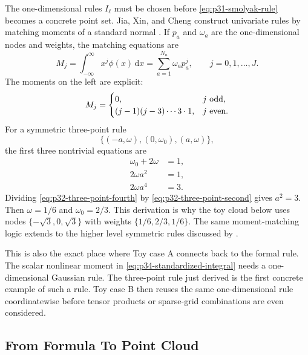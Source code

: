 \documentclass[11pt]{article}
\numberwithin{equation}{section}
\newcommand{\dd}{\,\mathrm d}
\begin{document}
The one-dimensional rules \(I_\ell\) must be chosen before
\eqref{eq:p31-smolyak-rule} becomes a concrete point set.  Jia, Xin, and Cheng
construct univariate rules by matching moments of a standard normal
\cite[Section 3.2]{jia2012sparsegrid}.  If \(p_a\) and \(\omega_a\) are the
one-dimensional nodes and weights, the matching equations are
\begin{equation}
  M_j
  =
  \int_{-\infty}^{\infty}x^j\phi(x)\dd x
  =
  \sum_{a=1}^{N_u}\omega_a p_a^j,
  \qquad j=0,1,\ldots,J.
  \label{eq:p32-univariate-moment-match}
\end{equation}
The moments on the left are explicit:
\begin{equation}
  M_j=
  \begin{cases}
  0, & j\ \hbox{odd},\\
  (j-1)(j-3)\cdots 3\cdot 1, & j\ \hbox{even}.
  \end{cases}
  \label{eq:p32-normal-moments}
\end{equation}
For a symmetric three-point rule
\[
  \{(-a,\omega),(0,\omega_0),(a,\omega)\},
\]
the first three nontrivial equations are
\begin{align}
  \omega_0+2\omega&=1,
  \label{eq:p32-three-point-mass}\\
  2\omega a^2&=1,
  \label{eq:p32-three-point-second}\\
  2\omega a^4&=3.
  \label{eq:p32-three-point-fourth}
\end{align}
Dividing \eqref{eq:p32-three-point-fourth} by
\eqref{eq:p32-three-point-second} gives \(a^2=3\).  Then
\(\omega=1/6\) and \(\omega_0=2/3\).  This derivation is why the toy cloud
below uses nodes \(\{-\sqrt3,0,\sqrt3\}\) with weights
\(\{1/6,2/3,1/6\}\).  The same moment-matching logic extends to the higher
level symmetric rules discussed by \citet[Section 3.2]{jia2012sparsegrid}.

This is also the exact place where Toy case A connects back to the formal rule.
The scalar nonlinear moment in \eqref{eq:p34-standardized-integral} needs a
one-dimensional Gaussian rule.  The three-point rule just derived is the first
concrete example of such a rule.  Toy case B then reuses the same one-dimensional
rule coordinatewise before tensor products or sparse-grid combinations are even
considered.

\subsection{From Formula To Point Cloud}
\label{subsec:p32-cloud-construction}
\end{document}
